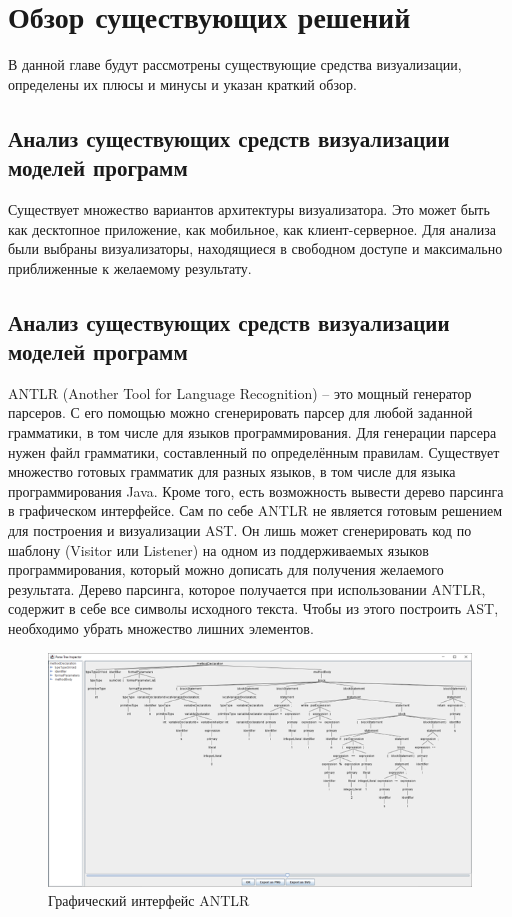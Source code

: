 \chapter{Обзор существующих решений} \label{ch2}
В данной главе будут рассмотрены существующие средства визуализации, определены их плюсы и минусы и указан краткий обзор.
\section{Анализ существующих средств визуализации моделей программ} \label{ch2:sec1}
Существует множество вариантов архитектуры визуализатора. Это может быть как десктопное приложение, как мобильное, как клиент-серверное. Для анализа были выбраны визуализаторы, находящиеся в свободном доступе и максимально приближенные к желаемому результату.
\section{Анализ существующих средств визуализации моделей программ} \label{ch2:sec1-abbr}
ANTLR (Another Tool for Language Recognition) – это мощный генератор парсеров. С его помощью можно сгенерировать парсер для любой заданной грамматики, в том числе для языков программирования. Для генерации парсера нужен файл грамматики, составленный по определённым правилам. Существует множество готовых грамматик для разных языков, в том числе для языка программирования Java. Кроме того, есть возможность вывести дерево парсинга в графическом интерфейсе.
Сам по себе ANTLR не является готовым решением для построения и визуализации AST. Он лишь может сгенерировать код по шаблону (Visitor или Listener) на одном из поддерживаемых языков программирования, который можно дописать для получения желаемого результата. Дерево парсинга, которое получается при использовании ANTLR, содержит в себе все символы исходного текста. Чтобы из этого построить AST, необходимо убрать множество лишних элементов.
\begin{figure}[ht!] 
	\center
	\includegraphics [scale=0.27] {my_folder/images/my/8}
	\caption{Графический интерфейс ANTLR} 
	\label{fig:8}  
\end{figure}
